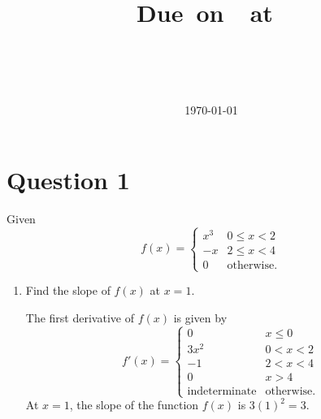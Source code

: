 \documentclass{article}
\title{
    \vspace{2in}
    \textmd{\textbf{\unitName}} \\
    \vspace{0.1in}
    \textbf{\docTitle} \\
    \vspace{0.1in}
    \small{Due\ on\ \dueDate\ at\ \dueTime} \\
    \vspace{0.1in}
    \large{\textit{\unitInstructorName}} \\
    \vspace{0.1in}
    \unitTime
    \vspace{2in}
}
\author{\textbf{\authorName} \\ \authorStudentNumber}
\date{\today}
\begin{document}
\maketitle
\newpage
\section{Question 1}
Given
\begin{equation}
    f\left( x \right) =
    \begin{cases}
        x^3 & 0 \leqslant x < 2 \\
        -x  & 2 \leqslant x < 4 \\
        0   & \text{otherwise}.
    \end{cases}
\end{equation}
\begin{enumerate}[label=(\alph*)]
    \item Find the slope of \(f\left( x \right)\) at \(x = 1\).
          \begin{solution}
              The first derivative of \(f\left( x \right)\) is given by
              \begin{equation*}
                  f'\left( x \right) =
                  \begin{cases}
                      0                    & x \leqslant 0     \\
                      3x^2                 & 0 < x < 2         \\
                      -1                   & 2 < x < 4         \\
                      0                    & x > 4             \\
                      \text{indeterminate} & \text{otherwise}.
                  \end{cases}
              \end{equation*}
              At \(x = 1\), the slope of the function \(f\left( x \right)\) is
              \(3 \left( 1 \right)^2 = 3\).
          \end{solution}
\end{enumerate}
\end{document}

